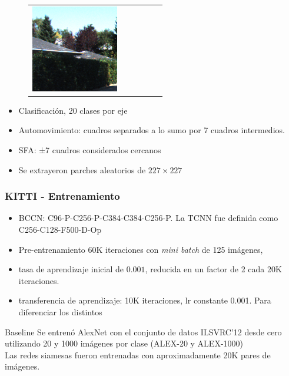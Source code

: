 \documentclass{beamer}
\begin{document}
\begin{frame}
\begin{figure}
{\begin{tabular}{cccccc}
\includegraphics[width = 1.5in]{./images/kitti/c1.png}\\
\end{tabular}
}
\label{fig:kitti-sample}
\end{figure}
\vfill
\begin{itemize}
    \item Clasificación, 20 clases por eje
    \item Automovimiento: cuadros separados a lo sumo por 7 cuadros intermedios.
    \item SFA: ±7 cuadros considerados cercanos
    \item Se extrayeron parches aleatorios de \(227 \times 227\)
\end{itemize}
\vfill
\end{frame}





\begin{frame}[plain]
\frametitle{KITTI - Entrenamiento}
\vfill
\begin{itemize}
    \item BCCN: C96-P-C256-P-C384-C384-C256-P. La TCNN fue definida como C256-C128-F500-D-Op
    \item Pre-entrenamiento 60K iteraciones con \textit{mini batch} de 125 imágenes,
    \item tasa de aprendizaje inicial de \(0.001\), reducida en un factor de 2 cada 20K iteraciones.
    \item transferencia de aprendizaje: 10K iteraciones, lr constante 0.001. Para diferenciar los distintos
\end{itemize}\pause
\vfill
\begin{block}{Baseline}
Se entrenó AlexNet con el conjunto de datos ILSVRC'12 desde cero utilizando 20 y 1000 imágenes por clase (ALEX-20 y ALEX-1000)\\
Las redes siamesas fueron entrenadas con aproximadamente 20K pares de imágenes.
\end{block}\pause
\vfill
\end{frame}
\end{document}
